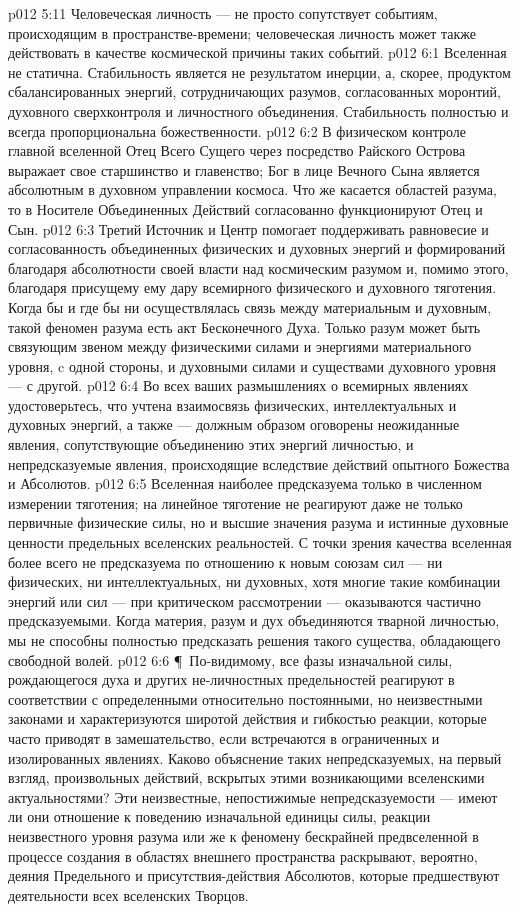\vs p012 5:11 Человеческая личность --- не просто сопутствует событиям, происходящим в пространстве\hyp{}времени; человеческая личность может также действовать в качестве космической причины таких событий.
\vs p012 6:1 Вселенная не статична. Стабильность является не результатом инерции, а, скорее, продуктом сбалансированных энергий, сотрудничающих разумов, согласованных моронтий, духовного сверхконтроля и личностного объединения. Стабильность полностью и всегда пропорциональна божественности.
\vs p012 6:2 В физическом контроле главной вселенной Отец Всего Сущего через посредство Райского Острова выражает свое старшинство и главенство; Бог в лице Вечного Сына является абсолютным в духовном управлении космоса. Что же касается областей разума, то в Носителе Объединенных Действий согласованно функционируют Отец и Сын.
\vs p012 6:3 Третий Источник и Центр помогает поддерживать равновесие и согласованность объединенных физических и духовных энергий и формирований благодаря абсолютности своей власти над космическим разумом и, помимо этого, благодаря присущему ему дару всемирного физического и духовного тяготения. Когда бы и где бы ни осуществлялась связь между материальным и духовным, такой феномен разума есть акт Бесконечного Духа. Только разум может быть связующим звеном между физическими силами и энергиями материального уровня, c одной стороны, и духовными силами и существами духовного уровня --- с другой.
\vs p012 6:4 Во всех ваших размышлениях о всемирных явлениях удостоверьтесь, что учтена взаимосвязь физических, интеллектуальных и духовных энергий, а также --- должным образом оговорены неожиданные явления, сопутствующие объединению этих энергий личностью, и непредсказуемые явления, происходящие вследствие действий опытного Божества и Абсолютов.
\vs p012 6:5 Вселенная наиболее предсказуема только в численном измерении тяготения; на линейное тяготение не реагируют даже не только первичные физические силы, но и высшие значения разума и истинные духовные ценности предельных вселенских реальностей. С точки зрения качества вселенная более всего не предсказуема по отношению к новым союзам сил --- ни физических, ни интеллектуальных, ни духовных, хотя многие такие комбинации энергий или сил --- при критическом рассмотрении --- оказываются частично предсказуемыми. Когда материя, разум и дух объединяются тварной личностью, мы не способны полностью предсказать решения такого существа, обладающего свободной волей.
\vs p012 6:6 \P\ По\hyp{}видимому, все фазы изначальной силы, рождающегося духа и других не\hyp{}личностных предельностей реагируют в соответствии с определенными относительно постоянными, но неизвестными законами и характеризуются широтой действия и гибкостью реакции, которые часто приводят в замешательство, если встречаются в ограниченных и изолированных явлениях. Каково объяснение таких непредсказуемых, на первый взгляд, произвольных действий, вскрытых этими возникающими вселенскими актуальностями? Эти неизвестные, непостижимые непредсказуемости --- имеют ли они отношение к поведению изначальной единицы силы, реакции неизвестного уровня разума или же к феномену бескрайней предвселенной в процессе создания в областях внешнего пространства раскрывают, вероятно, деяния Предельного и присутствия\hyp{}действия Абсолютов, которые предшествуют деятельности всех вселенских Творцов.
